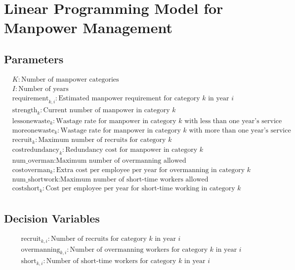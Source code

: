 \documentclass{article}
\begin{document}
\section*{Linear Programming Model for Manpower Management}

\subsection*{Parameters}
\begin{align*}
& K : \text{Number of manpower categories} \\
& I : \text{Number of years} \\
& \text{requirement}_{k, i} : \text{Estimated manpower requirement for category } k \text{ in year } i \\
& \text{strength}_{k} : \text{Current number of manpower in category } k \\
& \text{lessonewaste}_{k} : \text{Wastage rate for manpower in category } k \text{ with less than one year's service} \\
& \text{moreonewaste}_{k} : \text{Wastage rate for manpower in category } k \text{ with more than one year's service} \\
& \text{recruit}_{k} : \text{Maximum number of recruits for category } k \\
& \text{costredundancy}_{k} : \text{Redundancy cost for manpower in category } k \\
& \text{num\_overman} : \text{Maximum number of overmanning allowed} \\
& \text{costoverman}_{k} : \text{Extra cost per employee per year for overmanning in category } k \\
& \text{num\_shortwork} : \text{Maximum number of short-time workers allowed} \\
& \text{costshort}_{k} : \text{Cost per employee per year for short-time working in category } k \\
\end{align*}

\subsection*{Decision Variables}
\begin{align*}
& \text{recruit}_{k, i} : \text{Number of recruits for category } k \text{ in year } i \\
& \text{overmanning}_{k, i} : \text{Number of overmanning workers for category } k \text{ in year } i \\
& \text{short}_{k, i} : \text{Number of short-time workers for category } k \text{ in year } i \\
\end{align*}
\end{document}
